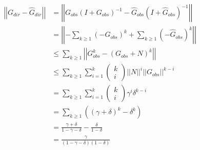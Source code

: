\documentclass[../Thesis.tex]{subfiles}
\begin{document}
\begin{equation}\label{eq:original noise error bound}
    \begin{split}
        \left|\left| G_{dir} - \hat{G}_{dir} \right|\right| & = \left|\left| G_{obs} \left(I + G_{obs}\right)^{-1} - \hat{G}_{obs}\left(I+\hat{G}_{obs}\right)^{-1}\right|\right|                                                                                                                                                                                                                    \\
                                                            & = \left|\left| - \sum_{k\geq 1} \left( - G_{obs}\right)^k  +  \sum_{k\geq 1} \left(-\hat{G}_{obs}\right)^k \right|\right|                                                                                                                                                                                                              \\
                                                            & \leq \sum_{k\geq 1} \left|\left|  G_{obs}^k  -  \left(G_{obs} + N\right)^k \right|\right|                                                                                                                                                                                                                                              \\
                                                            & \leq \sum_{k \geq 1} \sum_{i=1}^{k} \begin{pmatrix}k\\i\end{pmatrix} \left|\left| N \right|\right|^i \left|\left| G_{obs} \right|\right|^{k-i}                                                                                                                                                               \\
                                                            & = \sum_{k \geq 1} \sum_{i=1}^{k} \begin{pmatrix}k\\i\end{pmatrix} \gamma ^i \delta^{k-i}\\
                                                            & = \sum_{k\geq 1} \left( \left( \gamma + \delta\right)^k - \delta^k \right)                                                                                                                                 \\
                                                            & = \frac{\gamma + \delta}{1 - \gamma - \delta} - \frac{\delta}{1 - \delta} \\
                                                            & = \frac{\gamma}{(1-\gamma - \delta)(1-\delta)}
    \end{split}
\end{equation}
\end{document}
